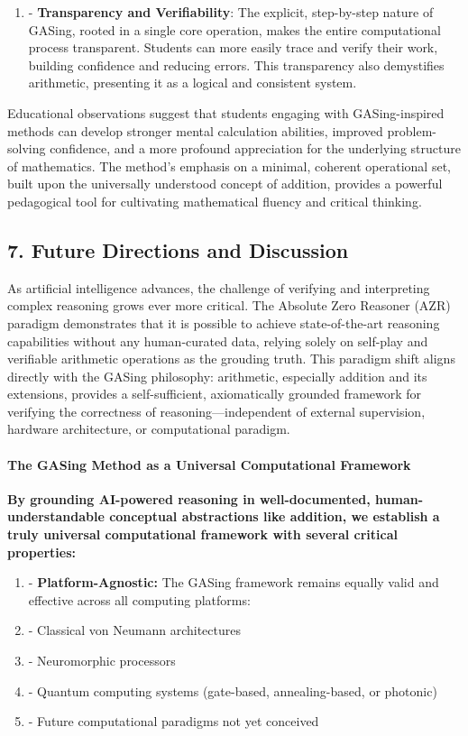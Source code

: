 \documentclass[11pt,a4paper]{article}
\begin{document}
\begin{enumerate}
  \item - \textbf{Transparency and Verifiability}: The explicit, step-by-step nature of GASing, rooted in a single core operation, makes the entire computational process transparent. Students can more easily trace and verify their work, building confidence and reducing errors. This transparency also demystifies arithmetic, presenting it as a logical and consistent system.
\end{enumerate}

Educational observations suggest that students engaging with GASing-inspired methods can develop stronger mental calculation abilities, improved problem-solving confidence, and a more profound appreciation for the underlying structure of mathematics. The method's emphasis on a minimal, coherent operational set, built upon the universally understood concept of addition, provides a powerful pedagogical tool for cultivating mathematical fluency and critical thinking.

\subsection{7. Future Directions and Discussion}
As artificial intelligence advances, the challenge of verifying and interpreting complex reasoning grows ever more critical. The Absolute Zero Reasoner (AZR) paradigm demonstrates that it is possible to achieve state-of-the-art reasoning capabilities without any human-curated data, relying solely on self-play and verifiable arithmetic operations as the grouding truth. This paradigm shift aligns directly with the GASing philosophy: arithmetic, especially addition and its extensions, provides a self-sufficient, axiomatically grounded framework for verifying the correctness of reasoning—independent of external supervision, hardware architecture, or computational paradigm.

\paragraph{The GASing Method as a Universal Computational Framework}
\textbf{By grounding AI-powered reasoning in well-documented, human-understandable conceptual abstractions like addition, we establish a truly universal computational framework with several critical properties:}

\begin{enumerate}
  \item - \textbf{Platform-Agnostic:} The GASing framework remains equally valid and effective across all computing platforms:
  \item - Classical von Neumann architectures
  \item - Neuromorphic processors
  \item - Quantum computing systems (gate-based, annealing-based, or photonic)
  \item - Future computational paradigms not yet conceived
\end{enumerate}
\end{document}
